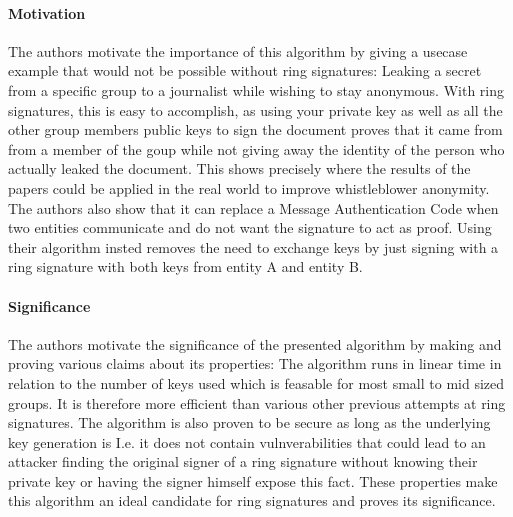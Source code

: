 \documentclass{scrartcl}[11pt]
\begin{document}
\paragraph{Motivation}{
The authors motivate the importance of this algorithm by giving a usecase example that would not be possible without ring signatures: Leaking a secret from a specific group to a journalist while wishing to stay anonymous. With ring signatures, this is easy to accomplish, as using your private key as well as all the other group members public keys to sign the document proves that it came from from a member of the goup while not giving away the identity of the person who actually leaked the document. This shows precisely where the results of the papers could be applied in the real world to improve whistleblower anonymity. The authors also show that it can replace a Message Authentication Code when two entities communicate and do not want the signature to act as proof. Using their algorithm insted removes the need to exchange keys by just signing with a ring signature with both keys from entity A and entity B.
}
\paragraph{Significance}{
The authors motivate the significance of the presented algorithm by making and proving various claims about its properties:
The algorithm runs in linear time in relation to the number of keys used which is feasable for most small to mid sized groups. It is therefore more efficient than various other previous attempts at ring signatures.
The algorithm is also proven to be secure as long as the underlying key generation is I.e. it does not contain vulnverabilities that could lead to an attacker finding the original signer of a ring signature without knowing their private key or having the signer himself expose this fact.
These properties make this algorithm an ideal candidate for ring signatures and proves its significance.
}
\end{document}
